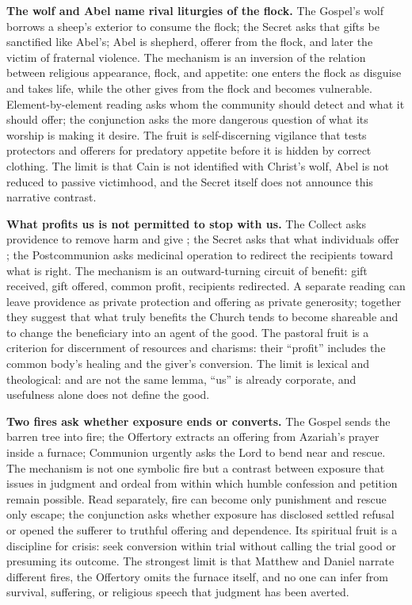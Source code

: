 \begin{deepstudy}
\noindent\textbf{The wolf and Abel name rival liturgies of the flock.\enspace{}}
The Gospel's wolf borrows a sheep's exterior to consume the flock; the Secret asks that gifts be sanctified like Abel's; Abel is shepherd, offerer from the flock, and later the victim of fraternal violence. The mechanism is an inversion of the relation between religious appearance, flock, and appetite: one enters the flock as disguise and takes life, while the other gives from the flock and becomes vulnerable. Element-by-element reading asks whom the community should detect and what it should offer; the conjunction asks the more dangerous question of what its worship is making it desire. The fruit is self-discerning vigilance that tests protectors and offerers for predatory appetite before it is hidden by correct clothing. The limit is that Cain is not identified with Christ's wolf, Abel is not reduced to passive victimhood, and the Secret itself does not announce this narrative contrast.

\noindent\textbf{What profits us is not permitted to stop with us.\enspace{}}
The Collect asks providence to remove harm and give ; the Secret asks that what individuals offer ; the Postcommunion asks medicinal operation to redirect the recipients toward what is right. The mechanism is an outward-turning circuit of benefit: gift received, gift offered, common profit, recipients redirected. A separate reading can leave providence as private protection and offering as private generosity; together they suggest that what truly benefits the Church tends to become shareable and to change the beneficiary into an agent of the good. The pastoral fruit is a criterion for discernment of resources and charisms: their ``profit'' includes the common body's healing and the giver's conversion. The limit is lexical and theological:  and  are not the same lemma, ``us'' is already corporate, and usefulness alone does not define the good.

\noindent\textbf{Two fires ask whether exposure ends or converts.\enspace{}}
The Gospel sends the barren tree into fire; the Offertory extracts an offering from Azariah's prayer inside a furnace; Communion urgently asks the Lord to bend near and rescue. The mechanism is not one symbolic fire but a contrast between exposure that issues in judgment and ordeal from within which humble confession and petition remain possible. Read separately, fire can become only punishment and rescue only escape; the conjunction asks whether exposure has disclosed settled refusal or opened the sufferer to truthful offering and dependence. Its spiritual fruit is a discipline for crisis: seek conversion within trial without calling the trial good or presuming its outcome. The strongest limit is that Matthew and Daniel narrate different fires, the Offertory omits the furnace itself, and no one can infer from survival, suffering, or religious speech that judgment has been averted.


\end{deepstudy}

